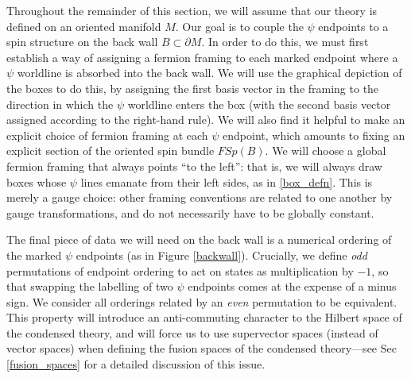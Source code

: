 \documentclass[12pt,a4paper]{article}
\newcommand{\kw}[1]{{\color{kwcolor}\footnotesize{(KW) #1}}}
\begin{document}
Throughout the remainder of this section, we will assume that our theory is defined on an oriented manifold $M$. 
Our goal is to couple the $\psi$ endpoints to a spin structure on the back wall $B \subset \partial M$. In order to do this, we must first establish a way of assigning a fermion framing to each marked endpoint where a $\psi$ worldline is absorbed into the back wall. 
We will use the graphical depiction of the boxes to do this, by assigning the first basis vector in the framing to the direction in which the $\psi$ worldline enters the box (with the second basis vector assigned according to the right-hand rule).
We will also find it helpful to make an explicit choice of fermion framing at each $\psi$ endpoint, which amounts to fixing an explicit section of the oriented spin bundle $FSp(B)$. 
We will choose a global fermion framing that always points ``to the left'': that is, we will always draw boxes whose $\psi$ lines emanate from their left sides, as in \eqref{box_defn}. 
This is merely a gauge choice: other framing conventions are related to one another by gauge transformations, and do not necessarily have to be globally constant. 

The final piece of data we will need on the back wall is a numerical ordering of the marked $\psi$ endpoints (as in Figure \ref{backwall}). 
Crucially, we define {\it odd} permutations of endpoint ordering to act on states as multiplication by $-1$, so that swapping the labelling of two $\psi$ endpoints comes at the expense of a minus sign. 
We consider all orderings related by an {\it even} permutation to be equivalent. 
This property will introduce an anti-commuting character to the Hilbert space of the condensed theory, and will force us to use supervector spaces (instead of vector spaces) when defining the fusion spaces of the condensed theory---see Sec \ref{fusion_spaces} for a detailed discussion of this issue. 
\end{document}
